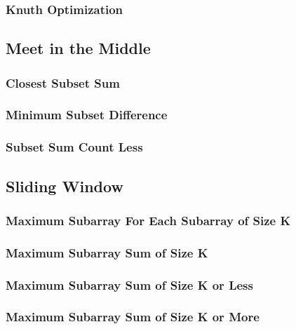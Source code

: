 \documentclass[8pt]{article}
\begin{document}
\subsubsection{Knuth Optimization}


\subsection{Meet in the Middle}
\subsubsection{Closest Subset Sum}

\subsubsection{Minimum Subset Difference}

\subsubsection{Subset Sum Count Less}


\subsection{Sliding Window}
\subsubsection{Maximum Subarray For Each Subarray of Size K}

\subsubsection{Maximum Subarray Sum of Size K}

\subsubsection{Maximum Subarray Sum of Size K or Less}

\subsubsection{Maximum Subarray Sum of Size K or More}

\end{document}
